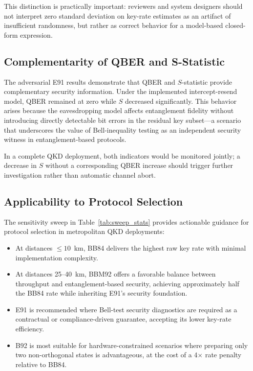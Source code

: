 \documentclass[journal]{IEEEtran}
\begin{document}
This distinction is practically important: reviewers and system
designers should not interpret zero standard deviation on key-rate
estimates as an artifact of insufficient randomness, but rather as
correct behavior for a model-based closed-form expression.

\subsection{Complementarity of QBER and S-Statistic}

The adversarial E91 results demonstrate that QBER and $S$-statistic
provide complementary security information. Under the implemented
intercept-resend model, QBER remained at zero while $S$ decreased
significantly. This behavior arises because the eavesdropping model
affects entanglement fidelity without introducing directly detectable
bit errors in the residual key subset—a scenario that underscores
the value of Bell-inequality testing as an independent security
witness in entanglement-based protocols.

In a complete QKD deployment, both indicators would be monitored
jointly; a decrease in $S$ without a corresponding QBER increase
should trigger further investigation rather than automatic
channel abort.

\subsection{Applicability to Protocol Selection}

The sensitivity sweep in Table~\ref{tab:sweep_stats} provides
actionable guidance for protocol selection in metropolitan QKD
deployments:
\begin{itemize}
  \item At distances $\leq 10$~km, BB84 delivers the highest raw
        key rate with minimal implementation complexity.
  \item At distances 25–40~km, BBM92 offers a favorable balance
        between throughput and entanglement-based security, achieving
        approximately half the BB84 rate while inheriting E91's
        security foundation.
  \item E91 is recommended where Bell-test security diagnostics
        are required as a contractual or compliance-driven guarantee,
        accepting its lower key-rate efficiency.
  \item B92 is most suitable for hardware-constrained scenarios
        where preparing only two non-orthogonal states is
        advantageous, at the cost of a 4$\times$ rate penalty
        relative to BB84.
\end{itemize}
\end{document}
